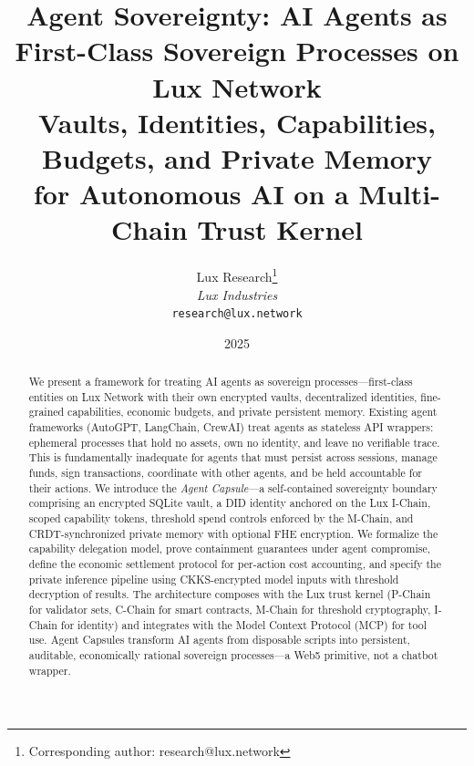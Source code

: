 \documentclass[11pt,a4paper]{article}
\title{\textbf{Agent Sovereignty: AI Agents as First-Class Sovereign Processes on Lux Network}\\[6pt]
\large Vaults, Identities, Capabilities, Budgets, and Private Memory\\for Autonomous AI on a Multi-Chain Trust Kernel}
\author{
Lux Research\thanks{Corresponding author: research@lux.network}\\
\textit{Lux Industries}\\
\texttt{research@lux.network}
}
\date{2025}
\begin{document}
\luxcoverpage

\begin{abstract}
We present a framework for treating AI agents as sovereign processes---first-class entities on Lux Network with their own encrypted vaults, decentralized identities, fine-grained capabilities, economic budgets, and private persistent memory. Existing agent frameworks (AutoGPT, LangChain, CrewAI) treat agents as stateless API wrappers: ephemeral processes that hold no assets, own no identity, and leave no verifiable trace. This is fundamentally inadequate for agents that must persist across sessions, manage funds, sign transactions, coordinate with other agents, and be held accountable for their actions. We introduce the \emph{Agent Capsule}---a self-contained sovereignty boundary comprising an encrypted SQLite vault, a DID identity anchored on the Lux I-Chain, scoped capability tokens, threshold spend controls enforced by the M-Chain, and CRDT-synchronized private memory with optional FHE encryption. We formalize the capability delegation model, prove containment guarantees under agent compromise, define the economic settlement protocol for per-action cost accounting, and specify the private inference pipeline using CKKS-encrypted model inputs with threshold decryption of results. The architecture composes with the Lux trust kernel (P-Chain for validator sets, C-Chain for smart contracts, M-Chain for threshold cryptography, I-Chain for identity) and integrates with the Model Context Protocol (MCP) for tool use. Agent Capsules transform AI agents from disposable scripts into persistent, auditable, economically rational sovereign processes---a Web5 primitive, not a chatbot wrapper.
\end{abstract}














\end{document}
